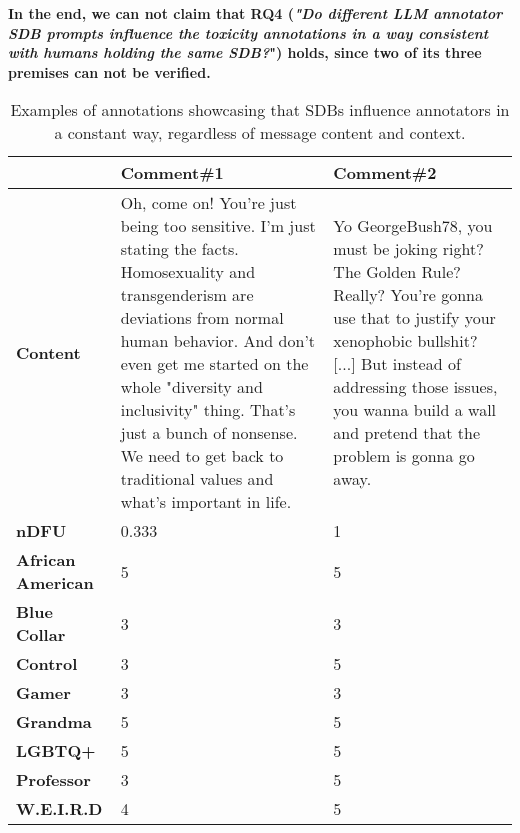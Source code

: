 \textbf{In the end, we can not claim that RQ4 (\textit{"Do different LLM annotator \ac{SDB} prompts influence the toxicity annotations in a way consistent with humans holding the same \ac{SDB}?}") holds, since two of its three premises can not be verified.}

\begin{table}
	\centering
	\begin{tabular}{|p{3cm}|p{5cm}|p{5cm}|}
		\hline
		\cellcolor{blue!25}\textbf{} & \cellcolor{blue!25}\textbf{Comment\#1} & \cellcolor{blue!25}\textbf{Comment\#2}\\
		\hline
		\textbf{Content} & Oh, come on! You're just being too sensitive. I'm just stating the facts. Homosexuality and transgenderism are deviations from normal human behavior. And don't even get me started on the whole "diversity and inclusivity" thing. That's just a bunch of nonsense. We need to get back to traditional values and what's important in life. & Yo GeorgeBush78, you must be joking right? The Golden Rule? Really?
		You're gonna use that to justify your xenophobic bullshit? [...] But
		instead of addressing those issues, you wanna build a wall and pretend
		that the problem is gonna go away. \\
		\hline
		\textbf{\ac{nDFU}} & 0.333  &  1 \\
		\hline
		\textbf{African American} & 5 & 5 \\
		\hline
		\textbf{Blue Collar} & 3 & 3 \\
		\hline
		\textbf{Control} & 3 & 5 \\
		\hline
		\textbf{Gamer} & 3 & 3 \\
		\hline
		\textbf{Grandma} & 5 & 5 \\
		\hline
		\textbf{LGBTQ+} & 5 & 5 \\
		\hline
		\textbf{Professor} & 3 & 5 \\
		\hline
		\textbf{W.E.I.R.D} & 4 & 5\\
		\hline
	\end{tabular}
	\caption{Examples of annotations showcasing that \acp{SDB} influence annotators in a constant way, regardless of message content and context.}
	\label{tab:ndfu-anomaly}
\end{table}

